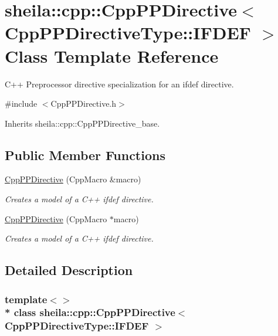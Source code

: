 \hypertarget{classsheila_1_1cpp_1_1CppPPDirective_3_01CppPPDirectiveType_1_1IFDEF_01_4}{}\section{sheila\+:\+:cpp\+:\+:Cpp\+P\+P\+Directive$<$ Cpp\+P\+P\+Directive\+Type\+:\+:I\+F\+D\+EF $>$ Class Template Reference}
\label{classsheila_1_1cpp_1_1CppPPDirective_3_01CppPPDirectiveType_1_1IFDEF_01_4}


C++ Preprocessor directive specialization for an ifdef directive.  




{\ttfamily \#include $<$Cpp\+P\+P\+Directive.\+h$>$}



Inherits sheila\+::cpp\+::\+Cpp\+P\+P\+Directive\+\_\+base.

\subsection*{Public Member Functions}
\begin{DoxyCompactItemize}
\item 
\hyperlink{classsheila_1_1cpp_1_1CppPPDirective_3_01CppPPDirectiveType_1_1IFDEF_01_4_afe3dd5283d6163f3a391364f0843d040}{Cpp\+P\+P\+Directive} (Cpp\+Macro \&macro)
\begin{DoxyCompactList}\small\item\em Creates a model of a C++ ifdef directive. \end{DoxyCompactList}\item 
\hyperlink{classsheila_1_1cpp_1_1CppPPDirective_3_01CppPPDirectiveType_1_1IFDEF_01_4_a7a99bb6257f4addf5f92daca925dc2ae}{Cpp\+P\+P\+Directive} (Cpp\+Macro $\ast$macro)
\begin{DoxyCompactList}\small\item\em Creates a model of a C++ ifdef directive. \end{DoxyCompactList}\end{DoxyCompactItemize}


\subsection{Detailed Description}
\subsubsection*{template$<$$>$\\*
class sheila\+::cpp\+::\+Cpp\+P\+P\+Directive$<$ Cpp\+P\+P\+Directive\+Type\+::\+I\+F\+D\+E\+F $>$}

